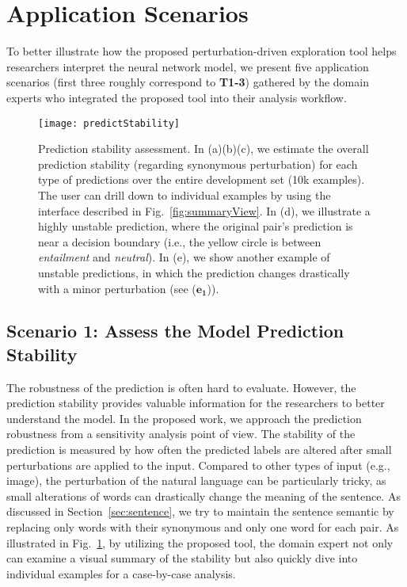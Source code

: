 \section{Application Scenarios}
\label{sec:caseStudy}
To better illustrate how the proposed perturbation-driven exploration tool helps researchers interpret the neural network model, we present five application scenarios (first three roughly correspond to \textbf{T1-3}) gathered by the domain experts who integrated the proposed tool into their analysis workflow.

\begin{figure}[htbp]
\centering
\vspace{-2mm}
 \texttt{[image: predictStability]}
 \vspace{-6mm}
 \caption{
Prediction stability assessment. In (a)(b)(c), we estimate the overall prediction stability (regarding synonymous perturbation) for each type of predictions over the entire development set (10k examples). The user can drill down to individual examples by using the interface described in Fig.~\ref{fig:summaryView}. In (d), we illustrate a highly unstable prediction, where the original pair's prediction is near a decision boundary (i.e., the yellow circle is between \emph{entailment} and \emph{neutral}). In (e), we show another example of unstable predictions, in which the prediction changes drastically with a minor perturbation (see ($\mathbf{e_1}$)). }
\label{fig:predictStability}
\vspace{-3mm}
\end{figure}

\subsection{Scenario 1: Assess the Model Prediction Stability}
The robustness of the prediction is often hard to evaluate. However, the prediction stability provides valuable information for the researchers to better understand the model.
%
In the proposed work, we approach the prediction robustness from a sensitivity analysis point of view. The stability of the prediction is measured by how often the predicted labels are altered after small perturbations are applied to the input.
%
Compared to other types of input (e.g., image), the perturbation of the natural language can be particularly tricky, as small alterations of words can drastically change the meaning of the sentence. As discussed in Section~\ref{sec:sentence}, we try to maintain the sentence semantic by replacing only words with their synonymous and only one word for each pair.
As illustrated in Fig.~\ref{fig:predictStability}, by utilizing the proposed tool, the domain expert not only can examine a visual summary of the stability but also quickly dive into individual examples for a case-by-case analysis.

